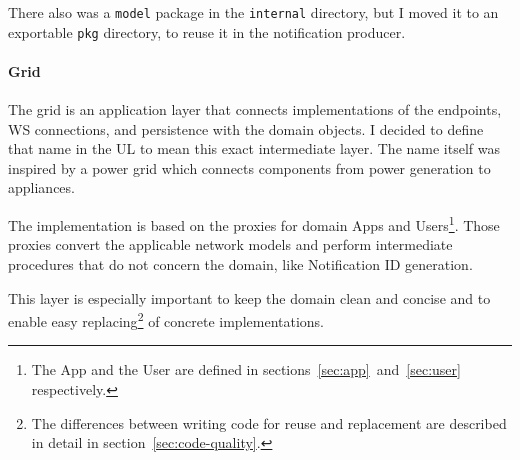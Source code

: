 There also was a \texttt{model} package
in the \texttt{internal} directory,
but I moved it to an exportable \texttt{pkg} directory,
to reuse it in the notification producer.

\paragraph{Grid}\label{sec:grid}

The grid is an application layer
that connects implementations of
the endpoints, \ac{WS} connections, and persistence
with the domain objects.
I decided to define that name in the \ac{UL}
to mean this exact intermediate layer.
The name itself was inspired by a power grid
which connects components
from power generation
to appliances.

The implementation is based on the proxies
for domain Apps and Users\footnote{
  The App and the User are defined in
  sections~\ref{sec:app}~and~\ref{sec:user}
  respectively.
}.
Those proxies convert the applicable network models
and perform intermediate procedures
that do not concern the domain,
like Notification \ac{ID} generation.

This layer is especially important
to keep the domain clean and concise
and to enable easy replacing\footnote{
  The differences between writing code
  for reuse and replacement are described in detail
  in section~\ref{sec:code-quality}.
}
of concrete implementations.
